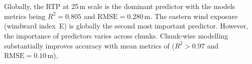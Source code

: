 \section*{}

\noindent
Globally, the RTP at 25\,m scale is the dominant predictor with the models metrics being $R^2\!=\!0.805$ and $\mathrm{RMSE}\!=\!0.280\,\mathrm{m}$. The eastern wind exposure (windward index~E) is globally the second most important predictor. However, the importance of predictors varies across chunks. Chunk-wise modelling substantially improves accuracy with mean metrics of
($R^2\!>\!0.97$ and  $\mathrm{RMSE}\!=\!0.10\,\mathrm{m}$), 
